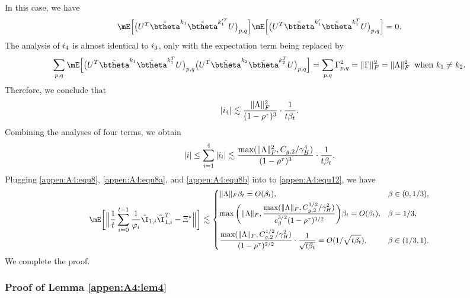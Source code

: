 \noindent In this case, we have
\begin{equation*}
\mE\Big[\big(U^T \tilde{\btheta}^{k_1}\tilde{\btheta}^{k_1^{\prime T}}U\big)_{p,q}\Big]\mE\Big[\big(U^T \tilde{\btheta}^{k_1^{\prime}}\tilde{\btheta}^{k_1^T}U\big)_{p,q}\Big] = 0.
\end{equation*}
The analysis of $\uppercase\expandafter{\romannumeral1}_4$ is almost identical to $\uppercase\expandafter{\romannumeral1}_3$, only with the expectation term being replaced by
\begin{equation*}
\sum_{p,q}\mE\Big[\big(U^T \tilde{\btheta}^{k_1} \tilde{\btheta}^{k_1^T} U\big)_{p,q}\big(U^T \tilde{\btheta}^{k_2} \tilde{\btheta}^{k_2^T }U\big)_{p,q}\Big] = \sum_{p,q} \Gamma_{p,q}^2 = \|\Gamma\|_F^2=\|\Lambda\|_F^2 \;\;\text{when } k_1\neq k_2.
\end{equation*}
Therefore, we conclude that 
\begin{equation*}\label{appen:A4:equ11}            
|\uppercase\expandafter{\romannumeral1}_4| \lesssim \frac{\|\Lambda\|_F^2}{(1-\rho^\tau)^3}\cdot\frac{1}{t\beta_t}.
\end{equation*}
Combining the analyses of four terms, we obtain
\begin{equation}\label{appen:A4:equ8b}
|\uppercase\expandafter{\romannumeral1}| \leq \sum_{i=1}^4 |\uppercase\expandafter{\romannumeral1}_i|\lesssim \frac{\max(\|\Lambda\|_F^2, C_{g,2}/\gamma_H^4)}{(1-\rho^\tau)^3}\cdot\frac{1}{t\beta_t}.
\end{equation}
Plugging \eqref{appen:A4:equ8}, \eqref{appen:A4:equ8a}, and \eqref{appen:A4:equ8b} into to \eqref{appen:A4:equ12}, we have
\begin{equation}\label{appen:A4:equ24}
\small\mE\bigg[\Big\|\frac{1}{t}\sum_{i=0}^{t-1}\frac{1}{\varphi_i}\tilde{\I}_{1,i}\tilde{\I}_{1,i}^T-\Xi^\star\Big\|\bigg] \lesssim \begin{dcases}
\|\Lambda\|_F\beta_t= O(\beta_t), &\beta\in(0,1/3),\\
\max\bigg(\|\Lambda\|_F, \frac{\max(\|\Lambda\|_F, C_{g,2}^{1/2}/\gamma_H^2)}{c_{\beta}^{3/2}(1-\rho^\tau)^{3/2}}\bigg) \beta_t = O(\beta_t), &\beta = 1/3,\\
\frac{\max(\|\Lambda\|_F, C_{g,2}^{1/2}/\gamma_H^2)}{(1-\rho^\tau)^{3/2}}\cdot \frac{1}{\sqrt{t\beta_t}}=O(1/\sqrt{t\beta_t}), &\beta\in(1/3,1).   
\end{dcases}
\end{equation}
We complete the proof.


\subsubsection{Proof of Lemma \ref{appen:A4:lem4}}\label{pf:hatI1}

